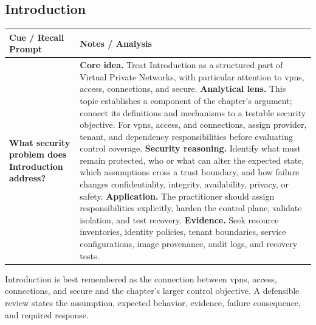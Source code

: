 \documentclass[11pt]{article}
\newcommand{\CornellHeader}{%
\rowcolor{Navy}\color{white}\bfseries Cue / Recall Prompt & \color{white}\bfseries Notes / Analysis\\\hline}
\newcommand{\CornellRow}[2]{%
\cellcolor{CueGray}\RaggedRight\textbf{#1} & \RaggedRight #2\\\hline}
\begin{document}
\subsection*{Introduction}
\begin{longtable}{>{\RaggedRight\arraybackslash}p{}|>{\RaggedRight\arraybackslash}p{}}
\CornellHeader
\CornellRow{What security problem does Introduction address?}{\textbf{Core idea.} Treat Introduction as a structured part of Virtual Private Networks, with particular attention to vpns, access, connections, and secure. \textbf{Analytical lens.} This topic establishes a component of the chapter's argument; connect its definitions and mechanisms to a testable security objective. For vpns, access, and connections, assign provider, tenant, and dependency responsibilities before evaluating control coverage. \textbf{Security reasoning.} Identify what must remain protected, who or what can alter the expected state, which assumptions cross a trust boundary, and how failure changes confidentiality, integrity, availability, privacy, or safety. \textbf{Application.} The practitioner should assign responsibilities explicitly, harden the control plane, validate isolation, and test recovery. \textbf{Evidence.} Seek resource inventories, identity policies, tenant boundaries, service configurations, image provenance, audit logs, and recovery tests.}
\end{longtable}
\begin{topicsummary}
Introduction is best remembered as the connection between vpns, access, connections, and secure and the chapter's larger control objective. A defensible review states the assumption, expected behavior, evidence, failure consequence, and required response.
\end{topicsummary}
\end{document}
